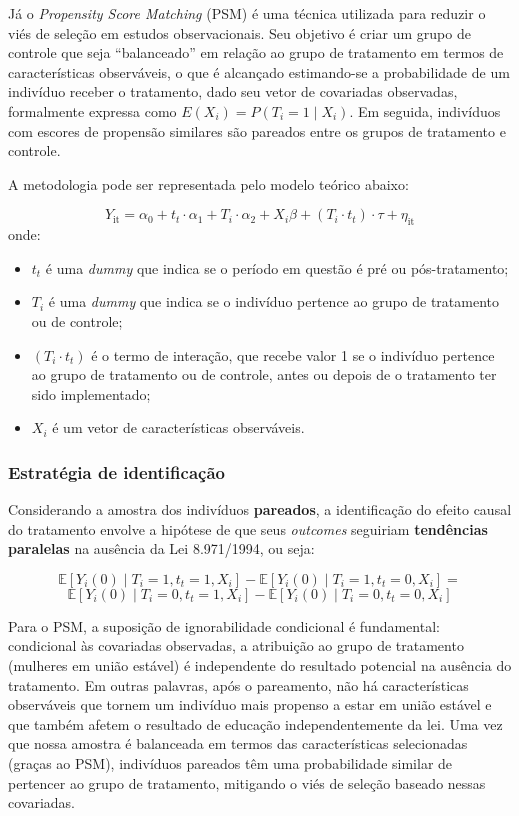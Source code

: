\documentclass[12pt,oneside,a4paper]{article}
\begin{document}
Já o \textit{Propensity Score Matching} (PSM) é uma técnica utilizada para reduzir o viés de seleção em estudos observacionais. Seu objetivo é criar um grupo de controle que seja ``balanceado'' em relação ao grupo de tratamento em termos de características observáveis, o que é alcançado estimando-se a probabilidade de um indivíduo receber o tratamento, dado seu vetor de covariadas observadas, formalmente expressa como $E(X_i)=P(T_i=1 \mid X_i)$. Em seguida, indivíduos com escores de propensão similares são pareados entre os grupos de tratamento e controle.

A metodologia pode ser representada pelo modelo teórico abaixo:

$$Y_\text{it} = \alpha_0 + t_t\cdot \alpha_1 + T_i\cdot \alpha_2 + X_i\beta + (T_i \cdot t_t)\cdot \tau + \eta_\text{it}$$ 
onde: 

\begin{itemize}
    \item $t_t$ é uma \textit{dummy} que indica se o período em questão é pré ou pós-tratamento;
    \item $T_i$ é uma \textit{dummy} que indica se o indivíduo pertence ao grupo de tratamento ou de controle;
    \item $(T_i\cdot t_t)$ é o termo de interação, que recebe valor 1 se o indivíduo pertence ao grupo de tratamento ou de controle, antes ou depois de o tratamento ter sido implementado;
    \item $X_i$ é um vetor de características observáveis.
\end{itemize}

\subsubsection{Estratégia de identificação}

Considerando a amostra dos indivíduos \textbf{pareados}, a identificação do efeito causal do tratamento envolve a hipótese de que seus \textit{outcomes} seguiriam \textbf{tendências paralelas} na ausência da Lei 8.971/1994, ou seja:

$$\mathbb{E}[Y_i(0) \mid T_i = 1, t_t = 1, X_i] - \mathbb{E}[Y_i(0) \mid T_i = 1, t_t=0, X_i] = $$
$$\mathbb{E}[Y_i(0) \mid T_i = 0, t_t =1, X_i] - \mathbb{E}[Y_i(0) \mid T_i = 0, t_t = 0, X_i]$$

Para o PSM, a suposição de ignorabilidade condicional é fundamental: condicional às covariadas observadas, a atribuição ao grupo de tratamento (mulheres em união estável) é independente do resultado potencial na ausência do tratamento. Em outras palavras, após o pareamento, não há características observáveis que tornem um indivíduo mais propenso a estar em união estável e que também afetem o resultado de educação independentemente da lei. Uma vez que nossa amostra é balanceada em termos das características selecionadas (graças ao PSM), indivíduos pareados têm uma probabilidade similar de pertencer ao grupo de tratamento, mitigando o viés de seleção baseado nessas covariadas.
\end{document}
